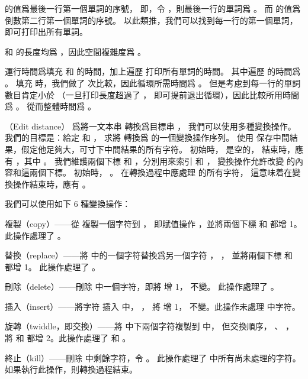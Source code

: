  的值爲最後一行第一個單詞的序號，
即，令 ，則最後一行的單詞爲 。
而  的值爲倒數第二行第一個單詞的序號。
以此類推，我們可以找到每一行的第一個單詞，即可打印出所有單詞。

 和  的長度均爲 ，因此空間複雜度爲 。

運行時間爲填充  和  的時間，加上遍歷  打印所有單詞的時間。
其中遍歷  的時間爲 。
填充  時，我們做了  次比較，因此循環所需時間爲 。
但是考慮到每一行的單詞數目肯定小於  （一旦打印長度超過了 ，
即可提前退出循環），因此比較所用時間爲 。
從而整體時間爲 。
\stopANSWER

\startPROBLEM
（Edit distance）
爲將一文本串  轉換爲目標串 ，
我們可以使用多種變換操作。
我們的目標是：給定  和 ，
求將  轉換爲  的一個變換操作序列。
使用  保存中間結果，假定他足夠大，可寸下中間結果的所有字符。
初始時，  是空的，
結束時，應有 ，其中 。
我們維護兩個下標  和 ，分別用來索引  和 ，
變換操作允許改變  的內容和這兩個下標。
初始時， 。
在轉換過程中應處理  的所有字符，
這意味着在變換操作結束時，應有 。

我們可以使用如下 6 種變換操作：
\startigBase
\item {\EMP 複製}（copy）——從  複製一個字符到 ，
即賦值操作 ，並將兩個下標  和  都增 1。
此操作處理了 。

\item {\EMP 替換}（replace）——將  中的一個字符替換爲另一個字符 ， ，
並將兩個下標  和  都增 1。
此操作處理了 。

\item {\EMP 刪除}（delete）——刪除  中一個字符，即將  增 1，  不變。
此操作處理了 。

\item {\EMP 插入}（insert）——將字符  插入  中， ，
將  增 1，  不變。此操作未處理  中字符。

\item {\EMP 旋轉}（twiddle，即交換）——將  中下兩個字符複製到  中，
但交換順序， 、 ，
將  和  都增 2。此操作處理了  和 。

\item {\EMP 終止}（kill）——刪除  中剩餘字符，令 。
此操作處理了  中所有尚未處理的字符。
如果執行此操作，則轉換過程結束。
\stopigBase

